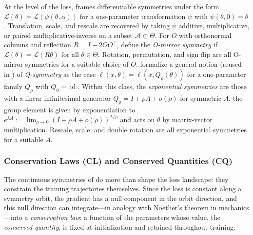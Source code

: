 \documentclass[mathematics,review,submit,moreauthors]{Definitions/mdpi}
\begin{document}
At the level of the loss, \citet{kunin2020} frames differentiable symmetries under the form $\mathcal{L}(\theta)=\mathcal{L}(\psi(\theta,\alpha))$ for a one-parameter transformation $\psi$ with $\psi(\theta,0)=\theta$.
Translation, scale, and rescale are recovered by taking $\psi$ additive, multiplicative, or paired multiplicative-inverse on a subset $\mathcal{A}\subset \Theta$.
For $O$ with orthonormal columns and reflection $R=I-2OO^{\top}$, \citet{ziyin2024} define the \emph{O-mirror symmetry} if $\mathcal{L}(\theta)=\mathcal{L}(R\theta)$ for all $\theta\in\Theta$.
Rotation, permutation, and sign flip are all O-mirror symmetries for a suitable choice of $O$.
\citet{ziyin2024a} formalize a general notion (reused in \citep{ziyin2025a}) of \emph{Q-symmetry} as the case $\ell(x,\theta)=\ell(x,Q_\rho(\theta))$ for a one-parameter family $Q_\rho$ with $Q_0=\operatorname{id}$.
Within this class, the \emph{exponential symmetries} are those with a linear infinitesimal generator $Q_\rho=I+\rho A+o(\rho)$ for symmetric $A$, the group element is given by exponentiation to $e^{\lambda A}:=\lim_{\rho\to0}(I+\rho A+o(\rho))^{\lambda/\rho}$ and acts on $\theta$ by matrix-vector multiplication.
Rescale, scale, and double rotation are all exponential symmetries for a suitable $A$.

\subsubsection{Conservation Laws (CL) and Conserved Quantities (CQ)}\label{sec:conservation-laws}

The continuous symmetries of  do more than shape the loss landscape: they constrain the training trajectories themselves.
Since the loss is constant along a symmetry orbit, the gradient has a null component in the orbit direction, and this null direction can integrate---in analogy with Noether's theorem in mechanics---into a \emph{conservation law}: a function of the parameters whose value, the \emph{conserved quantity}, is fixed at initialization and retained throughout training.
\end{document}
